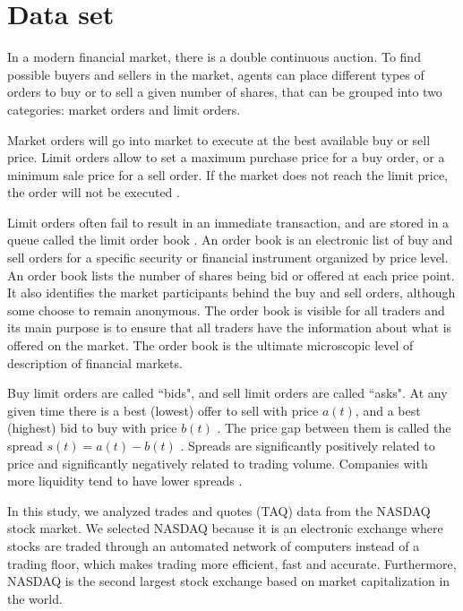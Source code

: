 \section{Data set}\label{sec:data}

In a modern financial market, there is a double continuous auction. To find
possible buyers and sellers in the market, agents can place different types of
orders to buy or to sell a given number of shares, that can be grouped into
two categories: market orders and limit orders.

Market orders will go into market to execute at the best available buy or sell
price. Limit orders allow to set a maximum purchase price for a buy order, or a
minimum sale price for a sell order. If the market does not reach the limit
price, the order will not be executed
\cite{large_prices_changes,predictive_pow,intro_market_micro,stat_theory}.

Limit orders often fail to result in an immediate transaction, and are stored
in a queue called the limit order book
\cite{stat_prop,predictive_pow,intro_market_micro,prop_order_book}. An order
book is an electronic list of buy and sell orders for a specific security or
financial instrument organized by price level. An order book lists the number
of shares being bid or offered at each price point. It also identifies the
market participants behind the buy and sell orders, although some choose to
remain anonymous. The order book is visible for all traders and its main
purpose is to ensure that all traders have the information about what is
offered on the market. The order book is the ultimate microscopic level of
description of financial markets.

Buy limit orders are called ``bids", and sell limit orders are called ``asks".
At any given time there is a best (lowest) offer to sell with price
$a\left(t\right)$, and a best (highest) bid to buy with price $b\left(t\right)$
\cite{subtle_nature,account_spread,limit_ord_spread,prop_order_book,stat_theory}.
The price gap between them is called the spread
$s\left(t\right) = a\left(t\right)-b\left(t\right)$
\cite{subtle_nature,market_digest,Bouchaud_2004,account_spread,em_stylized_facts,large_prices_changes,stat_theory}.
Spreads are significantly positively related to price and significantly
negatively related to trading volume. Companies with more liquidity tend to
have lower spreads
\cite{components_spread_tokyo,effects_spread,account_spread,components_spread}.

In this study, we analyzed trades and quotes (TAQ) data from the NASDAQ stock
market. We selected NASDAQ because it is an electronic exchange where stocks
are traded through an automated network of computers instead of a trading
floor, which makes trading more efficient, fast and accurate. Furthermore,
NASDAQ is the second largest stock exchange based on market capitalization
in the world.

